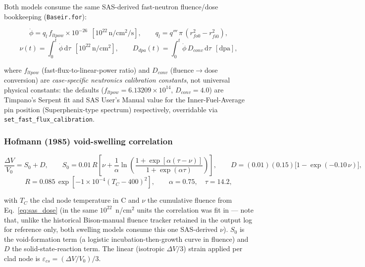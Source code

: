 \begin{refsection}
Both models consume the same SAS-derived fast-neutron fluence/dose
bookkeeping (\texttt{Baseir.for}):

\begin{equation}
  \dot{\phi} = q_l \, f_{ltpow} \times 10^{-26}\ \ [10^{22}\,\mathrm{n/cm^2/s}],
  \qquad q_l = q'''\,\pi\,(r_{fo0}^2 - r_{fi0}^2),
  \label{eq:sas_flux}
\end{equation}
\begin{equation}
  \nu(t) = \int_0^t \dot\phi\,\mathrm{d}\tau\ \ [10^{22}\,\mathrm{n/cm^2}],
  \qquad
  D_{dpa}(t) = \int_0^t \dot\phi\,D_{conv}\,\mathrm{d}\tau\ \ [\mathrm{dpa}],
  \label{eq:sas_dose}
\end{equation}

where $f_{ltpow}$ (fast-flux-to-linear-power ratio) and $D_{conv}$
(fluence$\to$dose conversion) are \emph{case-specific neutronics
calibration constants}, not universal physical constants: the defaults
($f_{ltpow} = 6.13209\times10^{14}$, $D_{conv} = 4.0$) are Timpano's
Serpent fit and SAS User's Manual value for the Inner-Fuel-Average pin
position (Superphenix-type spectrum) respectively, overridable via
\texttt{set\_fast\_flux\_calibration}.

\subsubsection{Hofmann (1985) void-swelling correlation}

\begin{equation}
  \frac{\Delta V}{V_0} = S_0 + D, \qquad
  S_0 = 0.01\,R\left[\nu + \frac{1}{\alpha}\ln\!
        \left(\frac{1+\exp[\alpha(\tau-\nu)]}{1+\exp(\alpha\tau)}\right)\right],
  \qquad
  D = (0.01)(0.15)\bigl[1-\exp(-0.10\,\nu)\bigr],
  \label{eq:hofmann_swelling}
\end{equation}
\begin{equation}
  R = 0.085\,\exp\!\left[-1\times10^{-4}(T_C - 400)^2\right],
  \qquad \alpha = 0.75,\quad \tau = 14.2,
  \label{eq:hofmann_R}
\end{equation}

with $T_C$ the clad node temperature in \textdegree C and $\nu$ the
cumulative fluence from Eq.~\eqref{eq:sas_dose} (in the same
$10^{22}$~n/cm$^2$ units the correlation was fit in --- note that, unlike
the historical Bison-manual fluence tracker retained in the output log for
reference only, both swelling models consume this one SAS-derived $\nu$).
$S_0$ is the void-formation term (a logistic incubation-then-growth curve
in fluence) and $D$ the solid-state-reaction term.  The linear (isotropic
$\Delta V/3$) strain applied per clad node is
$\varepsilon_{cs} = (\Delta V/V_0)/3$.


\end{refsection}
